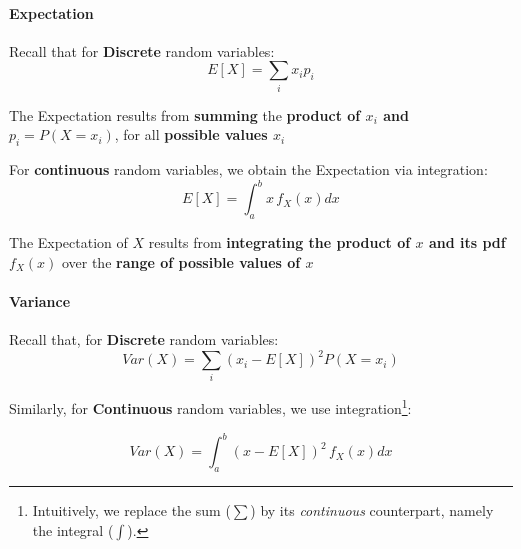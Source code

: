 \documentclass[notes=show,smaller]{beamer}\usepackage[]{graphicx}\usepackage[]{color}
\renewcommand{\Pr}{P}
\begin{document}
\begin{frame}{\secname}
\framesubtitle{Expectation}
  Recall that for  \textbf{Discrete} random variables:
  \begin{equation*}
  E\left[ X\right] =\sum_{i}x_{i}p_{i}
  \end{equation*}
  \begin{center}
  The Expectation results from \textbf{summing} the \textbf{product of $x_{i}$ and $p_{i}=P(X=x_{i})$}, for all \textbf{possible values $x_{i}$}
  \end{center}

  \medskip

  \pause

  \begin{definition}
  For \textbf{continuous} random variables, we obtain the Expectation via integration:
  \begin{equation*}
  E\left[ X\right] =\int_{a}^{b}x\,f_{X}\left( x\right)dx
  \end{equation*}

  \begin{center}
   The Expectation of $X$ results from \textbf{integrating the product of $x$ and its pdf $
  f_{X}\left( x\right) $} over the \textbf{range of possible values of $x$}
  \end{center}
  \end{definition}
\end{frame}

\begin{frame}{\secname}
\framesubtitle{Variance}
  Recall that, for \textbf{Discrete} random variables:
  \begin{equation*}
  Var\left( X\right) =\sum_{i}\left( x_{i}-E\left[ X\right] \right) ^{2}\Pr
  \left( X=x_{i}\right)
  \end{equation*}

  \bigskip

  \begin{definition}
  Similarly, for \textbf{Continuous} random variables, we use integration\footnote{Intuitively, we replace the sum ($\sum$) by its \emph{continuous} counterpart, namely the integral ($\int$).}:

  \begin{equation*}
  Var\left( X\right) =\int_{a}^{b}\left( x-E\left[ X\right] \right)
  ^{2}\,f_{X}\left( x\right) dx
  \end{equation*}
  \end{definition}
\end{frame}
\end{document}
